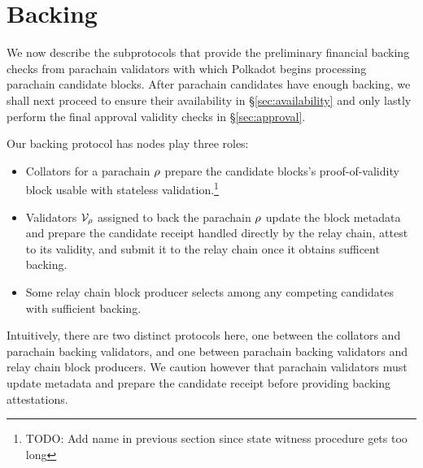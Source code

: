 
\section{Backing}
\label{sec:backing}

\newcommand\qin{\ensuremath{q_{\mathsf{in}}}}
\newcommand\qout{\ensuremath{q_{\mathsf{out}}}}

We now describe the subprotocols that provide the preliminary financial backing checks from parachain validators with which Polkadot begins processing parachain candidate blocks.  After parachain candidates have enough backing, we shall next proceed to ensure their availability in \S\ref{sec:availability} and only lastly perform the final approval validity checks in \S\ref{sec:approval}.

Our backing protocol has nodes play three roles:
\begin{itemize}
\item Collators for a parachain $\rho$ prepare the candidate blocks's proof-of-validity block usable with stateless validation.\footnote{TODO: Add name in previous section since state witness procedure gets too long} 
\item Validators $\mathcal{V}_{\rho}$ assigned to back the parachain $\rho$ update the block metadata and prepare the candidate receipt handled directly by the relay chain, attest to its validity, and submit it to the relay chain once it obtains sufficent backing. 
\item Some relay chain block producer selects among any competing candidates with sufficient backing.
\end{itemize}
Intuitively, there are two distinct protocols here, one between the collators and parachain backing validators, and one between parachain backing validators and relay chain block producers.  We caution however that parachain validators must update metadata and prepare the candidate receipt before providing backing attestations.




